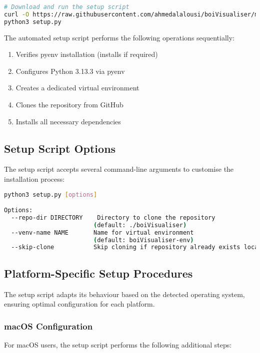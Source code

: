 \documentclass[11pt,a4paper]{article}
\begin{document}
\begin{lstlisting}[language=bash]
# Download and run the setup script
curl -O https://raw.githubusercontent.com/ahmedalalousi/boiVisualiser/main/setup.py
python3 setup.py
\end{lstlisting}

The automated setup script performs the following operations sequentially:

\begin{enumerate}
\item Verifies pyenv installation (installs if required)
\item Configures Python 3.13.3 via pyenv
\item Creates a dedicated virtual environment
\item Clones the repository from GitHub
\item Installs all necessary dependencies
\end{enumerate}

\subsection{Setup Script Options}

The setup script accepts several command-line arguments to customise the installation process:

\begin{lstlisting}[language=bash]
python3 setup.py [options]

Options:
  --repo-dir DIRECTORY    Directory to clone the repository 
                         (default: ./boiVisualiser)
  --venv-name NAME       Name for virtual environment 
                         (default: boiVisualiser-env)
  --skip-clone           Skip cloning if repository already exists locally
\end{lstlisting}

\subsection{Platform-Specific Setup Procedures}

The setup script adapts its behaviour based on the detected operating system, ensuring optimal configuration for each platform.

\subsubsection{macOS Configuration}

For macOS users, the setup script performs the following additional steps:
\end{document}
